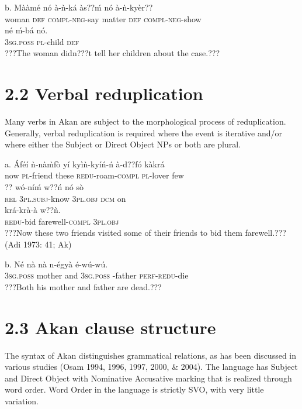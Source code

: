 \documentclass[output=paper]{langsci/langscibook}
\begin{document}
\ea
\gll  b.  Mààmé    nó  à-ǹ-ká       às??ḿ  nó  à-ǹ-kyèr??\\
       woman    \textsc{def}  \textsc{compl}{}-\textsc{neg}{}-say  matter  \textsc{def  compl}{}-\textsc{neg}{}-show\\
\gll   né    ḿ-bá    nó.\\
       \textsc{3sg.poss}  \textsc{pl}{}-child  \textsc{def}\\
\glt   ???The woman didn???t tell her children about the case.???  
\z

\section{2.2  Verbal reduplication}

Many verbs in Akan are subject to the morphological process of reduplication. Generally, verbal reduplication is required where the event is iterative and/or where either the Subject or Direct Object NPs or both are plural.

\ea
\gll a.  \'{A}féí  ǹ-nà\`{m}fò   yí   kyìǹ-kyíń-ń     à-d??fó     kàkrá \\
       now  \textsc{pl}{}-friend  these  \textsc{redu}{}-roam-\textsc{compl}  \textsc{pl}{}-lover  few  \\
\gll   ??  wó-níḿ     w??ń     nó   sò \\
       \textsc{rel}  \textsc{3pl.subj}{}-know  \textsc{3pl.obj}  \textsc{dcm}  on\\
\gll   krá-krà-à       w??ǹ.\\
       \textsc{redu}{}-bid farewell-\textsc{compl}  \textsc{3pl.obj}\\
\glt   ???Now these two friends visited some of their friends to bid them farewell.??? (Adi 1973: 41; Ak)
\z

\ea
\gll  b.  Né    nà    nà  n-égyà      é-wú-wú.\\
       \textsc{3sg.poss}  mother    and  \textsc{3sg.poss} -father  \textsc{perf-redu}{}-die\\
\glt   ???Both his mother and father are dead.??? \citep[24]{Martin1936}
\z

\section{2.3  Akan clause structure}

The syntax of Akan distinguishes grammatical relations, as has been discussed in various studies (Osam 1994, 1996, 1997, 2000, \& 2004). The language has Subject and Direct Object with Nominative Accusative marking that is realized through word order. Word Order in the language is strictly SVO, with very little variation.
\end{document}

